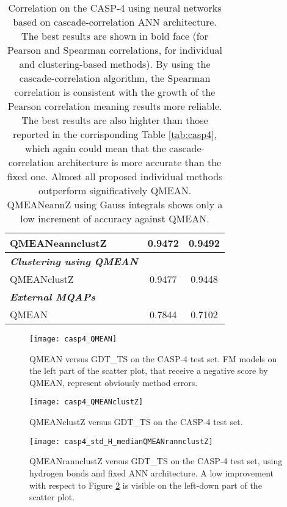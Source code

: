 \begin{table}[htbp]
\begin{tabular}{lcc}
 	QMEANeannclustZ	&0.9472	&0.9492\\
	\midrule                %
	\emph{\textbf{Clustering using QMEAN}} & &\\
	QMEANclustZ	&0.9477	&0.9448\\		
	\midrule                %
	\emph{\textbf{External MQAPs}}	& &\\
	QMEAN	&0.7844	&0.7102\\
\bottomrule                %
\end{tabular}
\caption[Performance on the CASP-4 test set using neural networks based on ca\-sca\-de-\-cor\-re\-la\-tion ANN architecture]{Correlation on the CASP-4 using neural networks based on ca\-sca\-de-\-cor\-re\-la\-tion ANN architecture. The best results are shown in bold face (for Pearson and Spearman correlations, for individual and clustering-based methods). By using the ca\-sca\-de-\-cor\-re\-la\-tion algorithm, the Spearman correlation is consistent with the growth of the Pearson correlation meaning results more reliable. The best results are also highter than those reported in the corrisponding Table \ref{tab:casp4}, which again could mean that the ca\-sca\-de-\-cor\-re\-la\-tion architecture is more accurate than the fixed one. Almost all proposed individual methods outperform significatively QMEAN. QMEANeannZ using Gauss integrals shows only a low increment of accuracy against QMEAN.}
\label{tab:casp4_cascade}
\end{table}


\begin{figure}[H]
	\begin{center}
		\texttt{[image: casp4\_QMEAN]}
		\caption[QMEAN versus GDT\_TS on the CASP-4 test set]{QMEAN versus GDT\_TS on the CASP-4 test set. FM models on the left part of the scatter plot, that receive a negative score by QMEAN, represent obviously method errors.}
		\label{fig:casp4_qmean}
	\end{center}
\end{figure}

\begin{figure}[H]
	\begin{center}
		\texttt{[image: casp4\_QMEANclustZ]}
		\caption[QMEANclustZ versus GDT\_TS on the CASP-4 test set]{QMEANclustZ versus GDT\_TS on the CASP-4 test set.}
		\label{fig:casp4_qmeanclustZ}
	\end{center}
\end{figure}

\begin{figure}[H]
	\begin{center}
		\texttt{[image: casp4\_std\_H\_medianQMEANrannclustZ]}
		\caption[QMEANrannclustZ versus GDT\_TS on the CASP-4 test set, using hydrogen bonds and fixed ANN architecture]{QMEANrannclustZ versus GDT\_TS on the CASP-4 test set, using hydrogen bonds and fixed ANN architecture. A low improvement with respect to Figure \ref{fig:casp4_qmeanclustZ}  is visible on the left-down part of the scatter plot.}
		\label{fig:casp4_std_H_medianQMEANrannclustZ}
	\end{center}
\end{figure}

